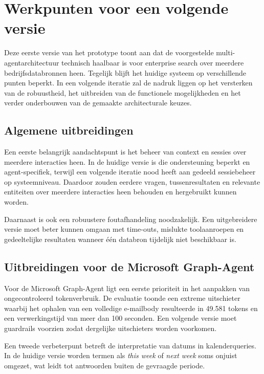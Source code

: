 \chapter{Werkpunten voor een volgende versie}
\label{chap:werkpunten-volgende-versie}

Deze eerste versie van het prototype toont aan dat de voorgestelde multi-agentarchitectuur technisch haalbaar is voor enterprise search over meerdere bedrijfsdatabronnen heen. Tegelijk blijft het huidige systeem op verschillende punten beperkt. In een volgende iteratie zal de nadruk liggen op het versterken van de robuustheid, het uitbreiden van de functionele mogelijkheden en het verder onderbouwen van de gemaakte architecturale keuzes.

\section{Algemene uitbreidingen}
\label{sec:Algemene uitbreidingen}

Een eerste belangrijk aandachtspunt is het beheer van context en sessies over meerdere interacties heen. In de huidige versie is die ondersteuning beperkt en agent-specifiek, terwijl een volgende iteratie nood heeft aan gedeeld sessiebeheer op systeemniveau. Daardoor zouden eerdere vragen, tussenresultaten en relevante entiteiten over meerdere interacties heen behouden en hergebruikt kunnen worden.

Daarnaast is ook een robuustere foutafhandeling noodzakelijk. Een uitgebreidere versie moet beter kunnen omgaan met time-outs, mislukte toolaanroepen en gedeeltelijke resultaten wanneer één databron tijdelijk niet beschikbaar is.

\section{Uitbreidingen voor de Microsoft Graph-Agent}
\label{sec:Uitbreidingen voor de Microsoft Graph-Agent}

Voor de Microsoft Graph-Agent ligt een eerste prioriteit in het aanpakken van ongecontroleerd tokenverbruik. De evaluatie toonde een extreme uitschieter waarbij het ophalen van een volledige e-mailbody resulteerde in 49.581 tokens en een verwerkingstijd van meer dan 100 seconden. Een volgende versie moet guardrails voorzien zodat dergelijke uitschieters worden voorkomen.

Een tweede verbeterpunt betreft de interpretatie van datums in kalenderqueries. In de huidige versie worden termen als \textit{this week} of \textit{next week} soms onjuist omgezet, wat leidt tot antwoorden buiten de gevraagde periode.

